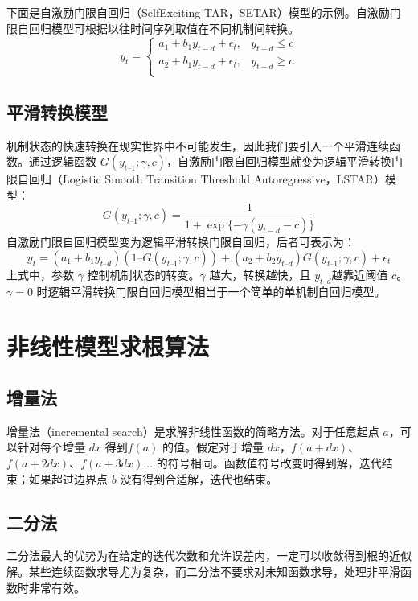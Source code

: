 下面是自激励门限自回归（SelfExciting TAR，SETAR）模型的示例。自激励门限自回归模型可根据以往时间序列取值在不同机制间转换。
\begin{equation}
    y_t = \begin{cases}
        a_1+b_1y_{t-d}+\epsilon_t, & y_{t-d}\leq c \\
        a_2+b_1y_{t-d}+\epsilon_t, & y_{t-d}\geq c \\
    \end{cases}
\end{equation}
\subsection{平滑转换模型}
机制状态的快速转换在现实世界中不可能发生，因此我们要引入一个平滑连续函数。通过逻辑函数 $G(y_{t–1}; \gamma, c)$，自激励门限自回归模型就变为逻辑平滑转换门限自回归（Logistic Smooth Transition Threshold Autoregressive，LSTAR）模型：
\begin{equation}
    G(y_{t–1}; \gamma, c)=\frac{1}{1+\exp\{-\gamma(y_{t-d}-c)\}}
\end{equation}
自激励门限自回归模型变为逻辑平滑转换门限自回归，后者可表示为：
\begin{equation}
    y_t = (a_1 + b_1y_{t–d})(1 – G(y_{t–1}; \gamma, c)) + (a_2 + b_2y_{t–d})G(y_{t–1}; \gamma , c) + \epsilon_t
\end{equation}
上式中，参数 $\gamma$ 控制机制状态的转变。$\gamma$ 越大，转换越快，且 $y_{t–d}$越靠近阈值 $c$。$\gamma  = 0$ 时逻辑平滑转换门限自回归模型相当于一个简单的单机制自回归模型。
\section{非线性模型求根算法}
\subsection{增量法}
增量法（incremental search）是求解非线性函数的简略方法。对于任意起点 $a$，可以针对每个增量 $dx$ 得到$f(a)$ 的值。假定对于增量 $dx$，$f(a + dx)$、$f(a + 2dx)$、$f(a + 3dx)\dots$ 的符号相同。函数值符号改变时得到解，迭代结束；如果超过边界点 $b$ 没有得到合适解，迭代也结束。
\subsection{二分法}
二分法最大的优势为在给定的迭代次数和允许误差内，一定可以收敛得到根的近似解。某些连续函数求导尤为复杂，而二分法不要求对未知函数求导，处理非平滑函数时非常有效。

